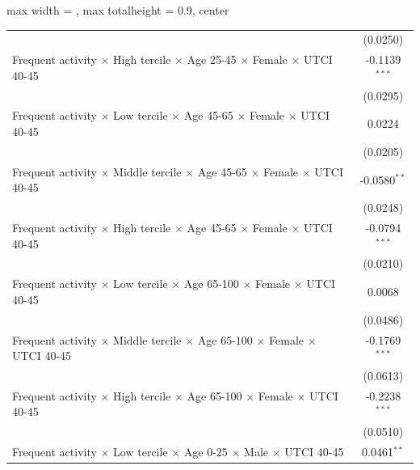 \begin{table}[htbp]
\begin{adjustbox}{max width = \textwidth, max totalheight = 0.9\textheight, center}
\begin{tabular}{lc}
                                                                                                               & (0.0250)\\   
         Frequent activity $\times$ High tercile $\times$ Age 25-45 $\times$ Female $\times$ UTCI 40-45        & -0.1139$^{***}$\\   
                                                                                                               & (0.0295)\\   
         Frequent activity $\times$ Low tercile $\times$ Age 45-65 $\times$ Female $\times$ UTCI 40-45         & 0.0224\\   
                                                                                                               & (0.0205)\\   
         Frequent activity $\times$ Middle tercile $\times$ Age 45-65 $\times$ Female $\times$ UTCI 40-45      & -0.0580$^{**}$\\   
                                                                                                               & (0.0248)\\   
         Frequent activity $\times$ High tercile $\times$ Age 45-65 $\times$ Female $\times$ UTCI 40-45        & -0.0794$^{***}$\\   
                                                                                                               & (0.0210)\\   
         Frequent activity $\times$ Low tercile $\times$ Age 65-100 $\times$ Female $\times$ UTCI 40-45        & 0.0068\\   
                                                                                                               & (0.0486)\\   
         Frequent activity $\times$ Middle tercile $\times$ Age 65-100 $\times$ Female $\times$ UTCI 40-45     & -0.1769$^{***}$\\   
                                                                                                               & (0.0613)\\   
         Frequent activity $\times$ High tercile $\times$ Age 65-100 $\times$ Female $\times$ UTCI 40-45       & -0.2238$^{***}$\\   
                                                                                                               & (0.0510)\\   
         Frequent activity $\times$ Low tercile $\times$ Age 0-25 $\times$ Male $\times$ UTCI 40-45            & 0.0461$^{**}$\\   

\end{tabular}
\end{adjustbox}
\end{table}
